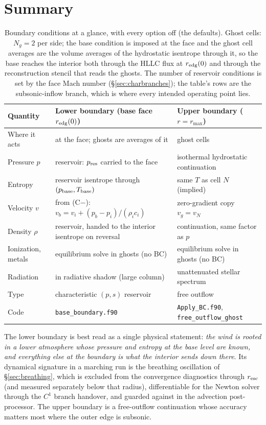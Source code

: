 \documentclass[english,a4paper]{my_memo}
\begin{document}
\section{Summary}

\begin{table}[h]
\centering
\small
\begin{tabular}{@{}lll@{}}
\toprule
Quantity & Lower boundary (base face $r_{\rm edg}(0)$) & Upper boundary ($r=r_{\max}$) \\
\midrule
Where it acts & at the face; ghosts are averages of it & ghost cells \\
Pressure $p$  & reservoir: $p_{\rm res}$ carried to the face & isothermal hydrostatic continuation \\
Entropy       & reservoir isentrope through $(p_{\rm base},T_{\rm base})$ & same $T$ as cell $N$ (implied) \\
Velocity $v$  & from (C$-$): $v_b = v_i + (p_b-p_i)/(\rho_i c_i)$ & zero-gradient copy $v_g = v_N$ \\
Density $\rho$ & reservoir, handed to the interior isentrope on reversal & continuation, same factor as $p$ \\
Ionization, metals & equilibrium solve in ghosts (no BC) & equilibrium solve in ghosts (no BC) \\
Radiation     & in radiative shadow (large column) & unattenuated stellar spectrum \\
Type          & characteristic $(p,s)$ reservoir & free outflow \\
Code          & \texttt{base\_boundary.f90} & \texttt{Apply\_BC.f90}, \texttt{free\_outflow\_ghost} \\
\bottomrule
\end{tabular}
\caption{Boundary conditions at a glance, with every option off (the
defaults). Ghost cells: $N_g = 2$ per side; the base condition is imposed at
the face and the ghost cell averages are the volume averages of the
hydrostatic isentrope through it, so the base reaches the interior both
through the HLLC flux at $r_{\rm edg}(0)$ and through the reconstruction
stencil that reads the ghosts. The number of reservoir conditions is set by
the face Mach number (\S\ref{sec:charbranches}); the table's rows are the
subsonic-inflow branch, which is where every intended operating point lies.}
\label{tab:summary}
\end{table}

The lower boundary is best read as a single physical statement: \emph{the
wind is rooted in a lower atmosphere whose pressure and entropy at the base
level are known, and everything else at the boundary is what the interior
sends down there}. Its dynamical signature in a marching run is the
breathing oscillation of \S\ref{sec:breathing}, which is excluded from the
convergence diagnostics through $r_{\rm esc}$ (and measured separately below
that radius), differentiable for the Newton solver through the $C^1$ branch
handover, and guarded against in the advection post-processor. The upper
boundary is a free-outflow continuation whose accuracy matters most where
the outer edge is subsonic.
\end{document}
